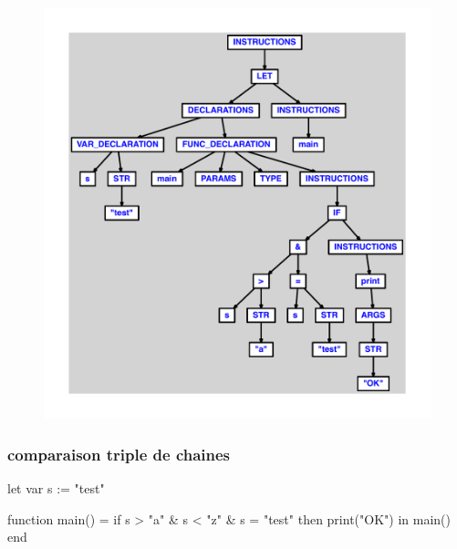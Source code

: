 \documentclass{article}
\begin{document}
\begin{figure}[H]\centering\includegraphics[max width=\textwidth]{ast/ast_181.pdf}\end{figure}\subsubsection{comparaison triple de chaines}
\begin{verbatimtab}
let
	var s := "test"

	function main() =
		if s > "a" & s < "z" & s = "test" then print("OK")
in main() end
\end{verbatimtab}
\end{document}

